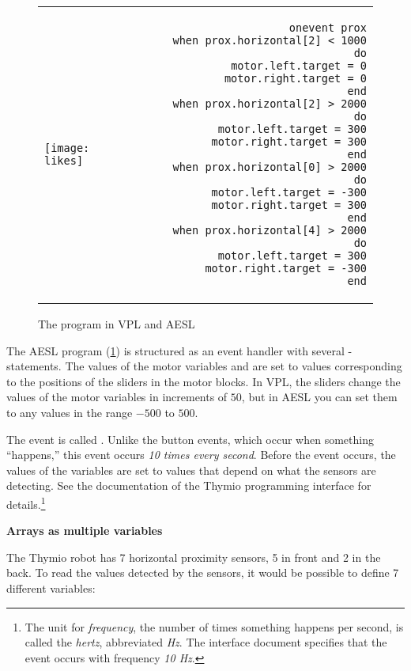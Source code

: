 \begin{figure}[hbt]
\begin{center}
\begin{tabular}{lr}
\texttt{[image: likes]} &
\begin{minipage}[b]{.4\textwidth}
\begin{footnotesize}
\begin{verbatim}
  onevent prox
    when prox.horizontal[2] < 1000 do
      motor.left.target = 0
      motor.right.target = 0
    end
    when prox.horizontal[2] > 2000 do
      motor.left.target = 300
      motor.right.target = 300
    end
    when prox.horizontal[0] > 2000 do
      motor.left.target = -300
      motor.right.target = 300
    end
    when prox.horizontal[4] > 2000 do
      motor.left.target = 300
      motor.right.target = -300
    end
\end{verbatim}
\end{footnotesize}
\end{minipage}
\end{tabular}
\caption{The  program in VPL and AESL}\label{fig.arrays}
\end{center}
\end{figure}

The AESL program (\cref{fig.arrays}) is structured as an event handler
with several -statements. The values of the motor variables
 and  are set to values
corresponding to the positions of the sliders in the motor blocks. In
VPL, the sliders change the values of the motor variables in increments
of $50$, but in AESL you can set them to any values in the range $-500$
to $500$.

The event is called . Unlike the button events, which
occur when something ``happens,'' this event occurs \emph{10 times
every second}. Before the event occurs, the values of the
 variables are set to values that depend on what the
sensors are detecting. See the\label{pg.hz} documentation of the
Thymio programming interface for details.\footnote{The unit
for \emph{frequency}, the number of times something happens per second, is called
the \emph{hertz}, abbreviated \emph{Hz}. The interface document specifies
that the {\footnotesize{}} event occurs with frequency \emph{10 Hz}.}

\textbf{\large Arrays as multiple variables}

The Thymio robot has 7 horizontal proximity sensors, 5 in front and 2 in
the back. To read the values detected by the sensors, it would be
possible to define 7 different variables:

